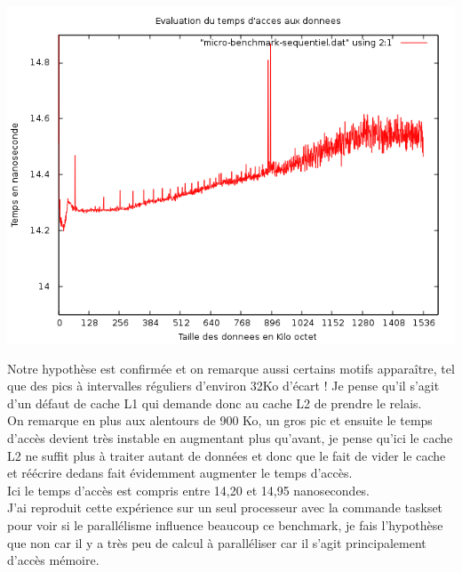 \documentclass[11pt,a4paper]{article}
\begin{document}
\begin{center}
\includegraphics[keepaspectratio=true,width=\linewidth]{Exercice1/micro-benchmark-sequentiel.png}
\end{center}
\pagebreak
Notre hypothèse est confirmée et on remarque aussi certains motifs apparaître, tel que des pics à intervalles réguliers d'environ 32Ko d'écart ! Je pense qu'il s'agit d'un défaut de cache L1 qui demande donc au cache L2 de prendre le relais.\\
On remarque en plus aux alentours de 900 Ko, un gros pic et ensuite le temps d'accès devient très instable en augmentant plus qu'avant, je pense qu'ici le cache L2 ne suffit plus à traiter autant de données et donc que le fait de vider le cache et réécrire dedans fait évidemment augmenter le temps d'accès.\\
Ici le temps d'accès est compris entre 14,20 et 14,95 nanosecondes.\\
J'ai reproduit cette expérience sur un seul processeur avec la commande taskset pour voir si le parallélisme influence beaucoup ce benchmark, je fais l'hypothèse que non car il y a très peu de calcul à paralléliser car il s'agit principalement d'accès mémoire.
\end{document}
